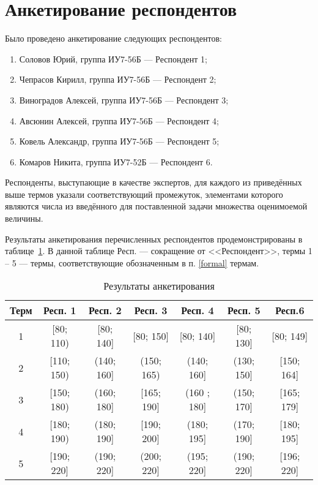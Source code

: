 \section{Анкетирование респондентов}

Было проведено анкетирование следующих респондентов:
\begin{enumerate}[label=\arabic*)]
	\item Соловов Юрий, группа ИУ7-56Б --- Респондент 1;
	\item Чепрасов Кирилл, группа ИУ7-56Б --- Респондент 2;
	\item Виноградов Алексей, группа ИУ7-56Б --- Респондент 3;
	\item Авсюнин Алексей, группа ИУ7-56Б --- Респондент 4;
	\item Ковель Александр, группа ИУ7-56Б --- Респондент 5;
	\item Комаров Никита, группа ИУ7-52Б --- Респондент 6.
\end{enumerate}

Респонденты, выступающие в качестве экспертов, для каждого из приведённых выше термов указали соответствующий промежуток, элементами которого являются числа из введённого для поставленной задачи множества оценимоемой величины.

Результаты анкетирования перечисленных респондентов продемонстрированы в таблице~\ref{tbl:anket}. В данной таблице Респ. --- сокращение от <<Респондент>>, термы 1 -- 5 --- термы, соответствующие обозначенным в п. \ref{formal} термам.
\clearpage

\begin{center}
	\captionsetup{justification=raggedright,singlelinecheck=off}
	\begin{longtable}[c]{|c|c|c|c|c|c|c|}
		\caption{Результаты анкетирования\label{tbl:anket}}\\ \hline
		Терм & Респ. 1 & Респ. 2 & Респ. 3  & Респ. 4 & Респ. 5 & Респ.6 \\ \hline
		1 &   [80; 110) &   [80; 140] & [80; 150]  & [80; 140] & [80; 130] & [80; 149] \\ \hline
		2 &   [110; 150) &   (140; 160] & (150; 165) & (140; 160] &  (130; 150] & [150; 164]\\ \hline
		3&   [150; 180) &   (160; 180] & [165; 190] & (160 ; 180]  & (150; 170] & [165; 179]\\ \hline
		4 &   [180; 190) &  (180; 190] & [190; 200] & (180; 195] & (170; 190] & [180; 195]\\ \hline
		5 &   [190; 220]  &  (190; 220] & (200; 220] & (195; 220] &  (190; 220] & [196; 220]\\ \hline
	\end{longtable}
\end{center}

